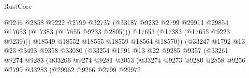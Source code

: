 \begin{lexlean}{RustCore}
\begin{coremodule}
                                            @9246
                                            @2858
                                            @9222
                                            @2799
                                            @32737
                                            (@33187
                                              @9232
                                              @2799
                                              @29911
                                              @29854
                                              @17653
                                              (@17383 (@17655 @9233 @2805)))
                                            @17653
                                            (@17383 (@17655 @9223 @9239)))
                                          @18549
                                          @18552
                                          @18555
                                          @18559
                                          @18564
                                          @18570))
                                      (@33247
                                        @1792
                                        @13
                                        @23
                                        @3493
                                        @9358
                                        @33080
                                        (@33254
                                          @1791
                                          @13
                                          @22
                                          @9285
                                          @9357
                                          (@33261
                                            @9274
                                            @9283
                                            (@33266
                                              @9274
                                              @9281
                                              @3053
                                              (@33274
                                                @9273
                                                @9280
                                                @2858
                                                @9256
                                                @2799
                                                @33283
                                                (@29962
                                                  @9266
                                                  @2799
                                                  @29972

\end{coremodule}
\end{lexlean}

